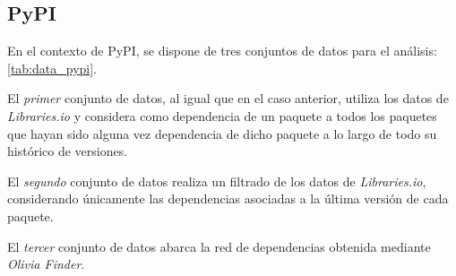 \subsection{PyPI}

En el contexto de PyPI, se dispone de tres conjuntos de datos para el análisis: \ref{tab:data_pypi}.

El \textit{primer} conjunto de datos, al igual que en el caso anterior, utiliza los datos de \textit{Libraries.io} y considera como dependencia de un paquete a todos los paquetes que hayan sido alguna vez dependencia de dicho paquete a lo largo de todo su histórico de versiones.

El \textit{segundo} conjunto de datos realiza un filtrado de los datos de \textit{Libraries.io}, considerando únicamente las dependencias asociadas a la última versión de cada paquete.

El \textit{tercer} conjunto de datos abarca la red de dependencias obtenida mediante \textit{Olivia Finder}.

